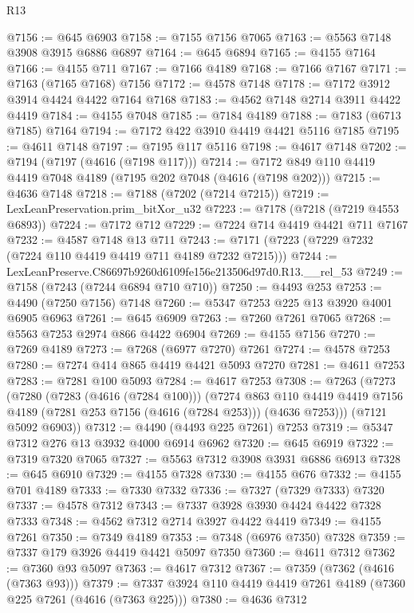 \begin{lexlean}{R13}
\begin{coremodule}
@7156 := @645 @6903
@7158 := @7155 @7156 @7065
@7163 := @5563 @7148 @3908 @3915 @6886 @6897
@7164 := @645 @6894
@7165 := @4155 @7164
@7166 := @4155 @711
@7167 := @7166 @4189
@7168 := @7166 @7167
@7171 := @7163 (@7165 @7168) @7156
@7172 := @4578 @7148
@7178 := @7172 @3912 @3914 @4424 @4422 @7164 @7168
@7183 := @4562 @7148 @2714 @3911 @4422 @4419
@7184 := @4155 @7048
@7185 := @7184 @4189
@7188 := @7183 (@6713 @7185) @7164
@7194 := @7172 @422 @3910 @4419 @4421 @5116 @7185
@7195 := @4611 @7148
@7197 := @7195 @117 @5116
@7198 := @4617 @7148
@7202 := @7194 (@7197 (@4616 (@7198 @117)))
@7214 := @7172 @849 @110 @4419 @4419 @7048 @4189 (@7195 @202 @7048 (@4616 (@7198 @202)))
@7215 := @4636 @7148
@7218 := @7188 (@7202 (@7214 @7215))
@7219 := LexLeanPreservation.prim_bitXor_u32
@7223 := @7178 (@7218 (@7219 @4553 @6893))
@7224 := @7172 @712
@7229 := @7224 @714 @4419 @4421 @711 @7167
@7232 := @4587 @7148 @13 @711
@7243 := @7171 (@7223 (@7229 @7232 (@7224 @110 @4419 @4419 @711 @4189 @7232 @7215)))
@7244 := LexLeanPreserve.C86697b9260d6109fe156e213506d97d0.R13.__rel_53
@7249 := @7158 (@7243 (@7244 @6894 @710 @710))
@7250 := @4493 @253
@7253 := @4490 (@7250 @7156) @7148
@7260 := @5347 @7253 @225 @13 @3920 @4001 @6905 @6963
@7261 := @645 @6909
@7263 := @7260 @7261 @7065
@7268 := @5563 @7253 @2974 @866 @4422 @6904
@7269 := @4155 @7156
@7270 := @7269 @4189
@7273 := @7268 (@6977 @7270) @7261
@7274 := @4578 @7253
@7280 := @7274 @414 @865 @4419 @4421 @5093 @7270
@7281 := @4611 @7253
@7283 := @7281 @100 @5093
@7284 := @4617 @7253
@7308 := @7263
    (@7273
      (@7280
        (@7283 (@4616 (@7284 @100)))
        (@7274
          @863
          @110
          @4419
          @4419
          @7156
          @4189
          (@7281 @253 @7156 (@4616 (@7284 @253)))
          (@4636 @7253)))
      (@7121 @5092 @6903))
@7312 := @4490 (@4493 @225 @7261) @7253
@7319 := @5347 @7312 @276 @13 @3932 @4000 @6914 @6962
@7320 := @645 @6919
@7322 := @7319 @7320 @7065
@7327 := @5563 @7312 @3908 @3931 @6886 @6913
@7328 := @645 @6910
@7329 := @4155 @7328
@7330 := @4155 @676
@7332 := @4155 @701 @4189
@7333 := @7330 @7332
@7336 := @7327 (@7329 @7333) @7320
@7337 := @4578 @7312
@7343 := @7337 @3928 @3930 @4424 @4422 @7328 @7333
@7348 := @4562 @7312 @2714 @3927 @4422 @4419
@7349 := @4155 @7261
@7350 := @7349 @4189
@7353 := @7348 (@6976 @7350) @7328
@7359 := @7337 @179 @3926 @4419 @4421 @5097 @7350
@7360 := @4611 @7312
@7362 := @7360 @93 @5097
@7363 := @4617 @7312
@7367 := @7359 (@7362 (@4616 (@7363 @93)))
@7379 := @7337 @3924 @110 @4419 @4419 @7261 @4189 (@7360 @225 @7261 (@4616 (@7363 @225)))
@7380 := @4636 @7312

\end{coremodule}
\end{lexlean}
